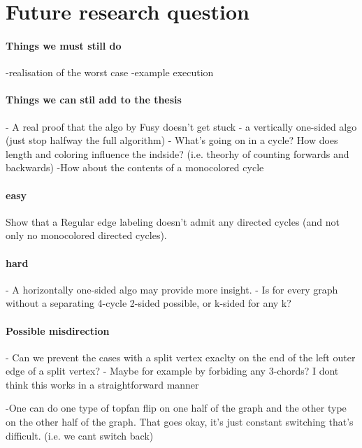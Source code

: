 \section{Future research question}

\paragraph{Things we must still do}
-realisation of the worst case
-example execution


\paragraph{Things we can stil add to the thesis}
- A real proof that the algo by Fusy doesn't get stuck
- a vertically one-sided algo (just stop halfway the full algorithm)
- What's going on in a cycle? How does length and coloring influence the indside? (i.e. theorhy of counting forwards and backwards)
  -How about the contents of a monocolored cycle

\paragraph{easy}
Show that a Regular edge labeling doesn't admit any directed cycles (and not only no monocolored directed cycles).

\paragraph{hard}
- A horizontally one-sided algo may provide more insight.
- Is for every graph without a separating 4-cycle 2-sided possible, or k-sided for any k?

\paragraph{Possible misdirection}
- Can we prevent the cases with a split vertex exaclty on the end of the left outer edge of a split vertex?
      - Maybe for example by forbiding any 3-chords? I dont think this works in a straightforward manner

-One can do one type of topfan flip on one half of the graph and the other type on the other half of the graph. That goes okay, it's just constant switching that's difficult. (i.e. we cant switch back)
